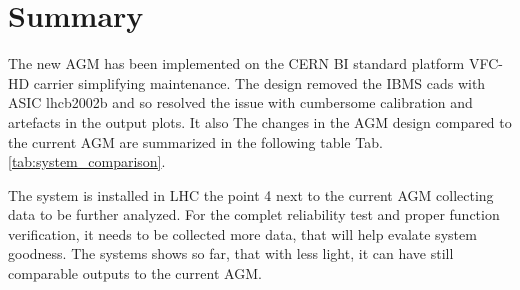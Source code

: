 \section{Summary}
The new AGM has been implemented on the CERN BI standard platform VFC-HD
carrier simplifying maintenance. The design removed the IBMS cads with ASIC
lhcb2002b and so resolved the issue with cumbersome calibration and artefacts
in the output plots.  It also The changes in the AGM design compared to the
current AGM are summarized in the following table Tab.
\ref{tab:system_comparison}.
 
The system is installed in LHC the point 4 next to the current AGM collecting data
to be further analyzed. For the complet reliability test and proper function
verification, it needs to be collected more data, that will help evalate system
goodness. The systems shows so far, that with less light, it can have still
comparable outputs to the current AGM. 





